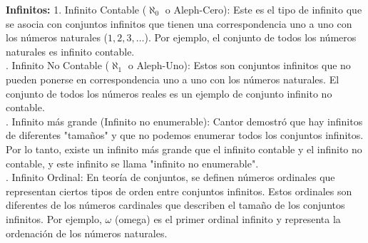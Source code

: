 \noindent \textbf{Infinitos:} 1. Infinito Contable (\( \aleph_0 \) o Aleph-Cero): Este es el tipo de infinito que se asocia con conjuntos infinitos que tienen una correspondencia uno a uno con los números naturales (\( 1, 2, 3, \ldots \)). Por ejemplo, el conjunto de todos los números naturales es infinito contable.\\

. Infinito No Contable (\( \aleph_1 \) o Aleph-Uno): Estos son conjuntos infinitos que no pueden ponerse en correspondencia uno a uno con los números naturales. El conjunto de todos los números reales es un ejemplo de conjunto infinito no contable. \\

. Infinito más grande (Infinito no enumerable): Cantor demostró que hay infinitos de diferentes "tamaños" y que no podemos enumerar todos los conjuntos infinitos. Por lo tanto, existe un infinito más grande que el infinito contable y el infinito no contable, y este infinito se llama "infinito no enumerable". \\

. Infinito Ordinal: En teoría de conjuntos, se definen números ordinales que representan ciertos tipos de orden entre conjuntos infinitos. Estos ordinales son diferentes de los números cardinales que describen el tamaño de los conjuntos infinitos. Por ejemplo, \( \omega \) (omega) es el primer ordinal infinito y representa la ordenación de los números naturales. \\
